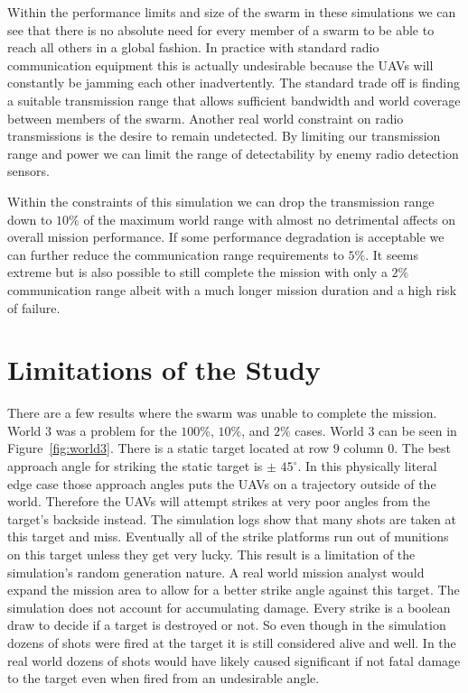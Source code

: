 \begin{multicols*}{2}
Within the performance limits and size of the swarm in these simulations we can see that there is no absolute need for every member of a swarm to be able to reach all others in a global fashion.  In practice with standard radio communication  equipment this is actually undesirable because the UAVs will constantly be jamming each other inadvertently.  The standard trade off is finding a suitable transmission range that allows sufficient bandwidth and world coverage between members of the swarm.  Another real world constraint on radio transmissions is the desire to remain undetected.  By limiting our transmission range and power we can limit the range of detectability by enemy radio detection sensors.

Within the constraints of this simulation we can drop the transmission range down to $10\%$ of the maximum world range with almost no detrimental affects on overall mission performance.  If some performance degradation is acceptable we can further reduce the communication range requirements to $5\%$.  It seems extreme but is also possible to still complete the mission with only a $2\%$ communication range albeit with a much longer mission duration and a high risk of failure.

\section{Limitations of the Study}
There are a few results where the swarm was unable to complete the mission.  World 3 was a problem for the $100\%$, $10\%$, and $2\%$ cases.  World 3 can be seen in Figure~\ref{fig:world3}.  There is a static target located at row 9 column 0.  The best approach angle for striking the static target is $\pm$ $45^{\circ}$.  In this physically literal edge case those approach angles puts the UAVs on a trajectory outside of the world.  Therefore the UAVs will attempt strikes at very poor angles from the target's backside instead.  The simulation logs show that many shots are taken at this target and miss.  Eventually all of the strike platforms run out of munitions on this target unless they get very lucky.  This result is a limitation of the simulation's random generation nature.  A real world mission analyst would expand the mission area to allow for a better strike angle against this target.  The simulation does not account for accumulating damage.  Every strike is a boolean draw to decide if a target is destroyed or not.  So even though in the simulation dozens of shots were fired at the target it is still considered alive and well.  In the real world dozens of shots would have likely caused significant if not fatal damage to the target even when fired from an undesirable angle.


\end{multicols*}

